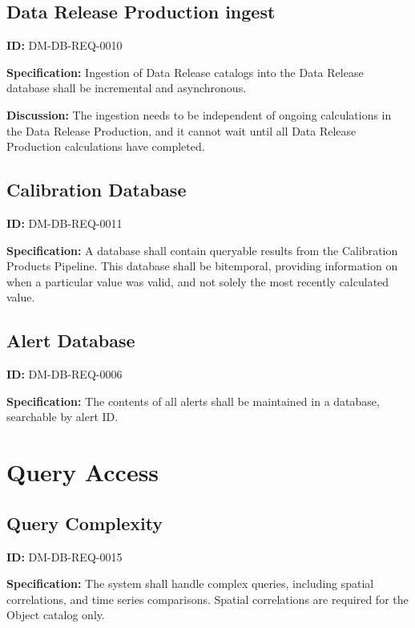 \documentclass[DM,toc]{lsstdoc}
\begin{document}
\subsection{Data Release Production ingest}

\label{DM-DB-REQ-0010}
\textbf{ID:} DM-DB-REQ-0010

\textbf{Specification:}
Ingestion of Data Release catalogs into the Data Release database shall be incremental and asynchronous.

\textbf{Discussion:}
The ingestion needs to be independent of ongoing calculations in the Data Release Production, and it cannot wait until all Data Release Production calculations have completed.

\subsection{Calibration Database}

\label{DM-DB-REQ-0011}
\textbf{ID:} DM-DB-REQ-0011

\textbf{Specification:}
A database shall contain queryable results from the Calibration Products Pipeline. This database shall be bitemporal, providing information on when a particular value was valid, and not solely the most recently calculated value.

\subsection{Alert Database}

\label{DM-DB-REQ-0006}
\textbf{ID:} DM-DB-REQ-0006

\textbf{Specification:}
The contents of all alerts shall be maintained in a database, searchable by alert ID.

\section{Query Access}

\subsection{Query Complexity}

\label{DM-DB-REQ-0015}
\textbf{ID:} DM-DB-REQ-0015

\textbf{Specification:}
The system shall handle complex queries, including spatial correlations, and time series comparisons. Spatial correlations are required for the Object catalog only.
\end{document}
